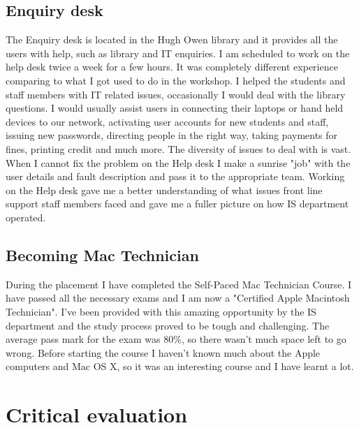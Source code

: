 \documentclass[10pt,a4paper,headinclude=true]{report}
\begin{document}
\section{Enquiry desk}
The Enquiry desk is located in the Hugh Owen library and it provides all the users with help, such as library and IT enquiries. I am scheduled to work on the help desk twice a week for a few hours. It was completely different experience comparing to what I got used to do in the workshop. I helped the students and staff members with IT related issues, occasionally I would deal with the library questions. I would usually assist users in connecting their laptops or hand held devices to our network, activating user accounts for new students and staff, issuing new passwords, directing people in the right way, taking payments for fines, printing credit and much more. The diversity of issues to deal with is vast. When I cannot fix the problem on the Help desk I make a sunrise "job" with the user details and fault description and pass it to the appropriate team. Working on the Help desk gave me a better understanding of what issues front line support staff members faced and gave me a fuller picture on how IS department operated.
  
\section{Becoming Mac Technician}
During the placement I have completed the Self-Paced Mac Technician Course. I have passed all the necessary exams and I am now a "Certified Apple Macintosh Technician". I've been provided with this amazing opportunity by the IS department and the study process proved to be tough and challenging. The average pass mark for the exam was 80\%, so there wasn't much space left to go wrong. Before starting the course I haven't known much about the Apple computers and Mac OS X, so it was an interesting course and I have learnt a lot. 
\chapter{Critical evaluation}
\end{document}
